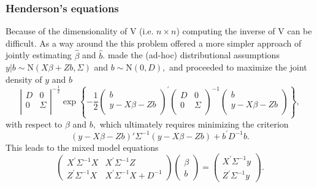 \documentclass[12pt, a4paper]{article}
\theoremstyle{plain}
\theoremstyle{definition}
\theoremstyle{remark}
\begin{document}
\subsubsection{Henderson's equations}
Because of the dimensionality of V (i.e. $n \times n$) computing the inverse of V can be difficult. As a way around the this problem \citet{Henderson53, Henderson59,Henderson63,Henderson73,Henderson84a} offered a more simpler approach of jointly estimating $\hat{\beta}$ and $\hat{b}$.
\cite{Henderson:1950} made the (ad-hoc) distributional assumptions $y|b \sim \mathrm{N} (X \beta + Zb, \Sigma)$ and $b \sim \mathrm{N}(0,D),$ and proceeded to maximize the joint density of $y$ and $b$
\begin{equation}
\left|
\begin{array}{cc}
D & 0 \\
0 & \Sigma \\
\end{array}
  \right|^{-\frac{1}{2}}
\exp
\left\{ -\frac{1}{2}
\left(
\begin{array}{c}
                b \\
                y - X \beta -Zb \\
              \end{array}
            \right)^\prime
\left( \begin{array}{cc}
D & 0 \\
0 & \Sigma \\
\end{array}\right)^{-1}
\left(
\begin{array}{c}
                b \\
                y - X \beta -Zb \\
              \end{array}
            \right)
\right\},
\label{u&beta:JointDensity}
\end{equation}
with respect to $\beta$ and $b,$ which ultimately requires minimizing the criterion
\begin{equation}
(y - X \beta -Zb)'\Sigma^{-1}(y - X \beta -Zb) + b^\prime D^{-1}b.
\label{Henderson:Criterion}
\end{equation}
This leads to the mixed model equations
\begin{equation}
\left(\begin{array}{cc}
  X^\prime\Sigma^{-1}X & X^\prime\Sigma^{-1}Z
  \\
  Z^\prime\Sigma^{-1}X & X^\prime\Sigma^{-1}X + D^{-1}
  \end{array}\right)
\left(\begin{array}{c}
    \beta \\
  b
  \end{array}\right)
  =
\left(\begin{array}{c}
  X^\prime\Sigma^{-1}y \\
  Z^\prime\Sigma^{-1}y
  \end{array}\right).
\label{Henderson:Equations}
\end{equation}
\end{document}
